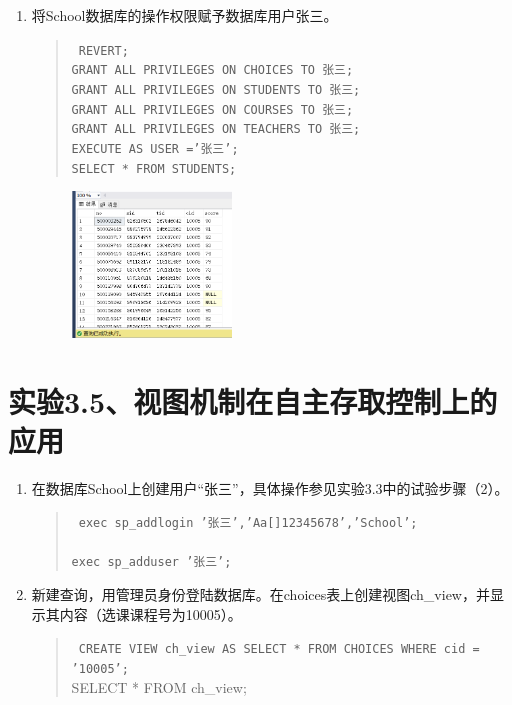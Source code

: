 \documentclass[a4paper,twoside]{article}
\begin{document}
\begin{spacing}{1.2}
\begin{enumerate}
  \item	将School数据库的操作权限赋予数据库用户张三。  
  \begin{quote}
    \texttt{
      REVERT;\\
GRANT ALL PRIVILEGES ON CHOICES TO 张三;\\
GRANT ALL PRIVILEGES ON STUDENTS TO 张三;\\
GRANT ALL PRIVILEGES ON COURSES TO 张三;\\
GRANT ALL PRIVILEGES ON TEACHERS TO 张三;\\
EXECUTE AS USER ='张三';\\
SELECT  * FROM  STUDENTS;\\
    }
  \end{quote}

  \begin{figure}[htb]
    \centering
    \includegraphics[width=0.4\textwidth]{16.png}
  \end{figure}


\end{enumerate}


\section{实验3.5、视图机制在自主存取控制上的应用}

\begin{enumerate}
\item	在数据库School上创建用户“张三”，具体操作参见实验3.3中的试验步骤（2）。
\begin{quote}
  \texttt{
    exec sp\_addlogin '张三','Aa[]12345678','School';\\ \\
exec sp\_adduser  '张三';\\
  }
\end{quote}
\item	新建查询，用管理员身份登陆数据库。在choices表上创建视图ch\_view，并显示其内容（选课课程号为10005）。
\begin{quote}
  \texttt{
    CREATE VIEW ch\_view
AS
    SELECT * FROM CHOICES
    WHERE cid = '10005';\\
  }
  SELECT * FROM ch\_view;\\
\end{quote}



\end{enumerate}
\end{spacing}
\end{document}
